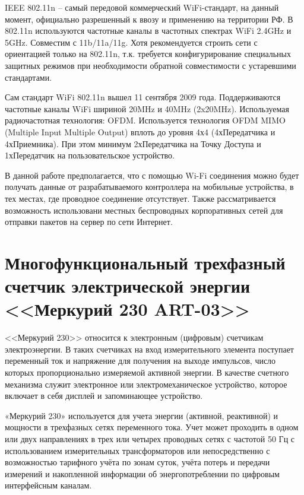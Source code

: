 \documentclass[utf8,14pt, coursreport]{G7-32}
\begin{document}
IEEE 802.11n – самый передовой коммерческий WiFi-стандарт, на данный момент, официально разрешенный к ввозу и применению на территории РФ. В 802.11n используются частотные каналы в частотных спектрах WiFi 2.4GHz и 5GHz. Совместим с 11b/11a/11g. Хотя рекомендуется строить сети с ориентацией только на 802.11n, т.к. требуется конфигурирование специальных защитных режимов при необходимости обратной совместимости с устаревшими стандартами\cite{wifistandarts}.

Сам стандарт WiFi 802.11n вышел 11 сентября 2009 года.
Поддерживаются частотные каналы WiFi шириной 20MHz и 40MHz (2x20MHz).
Используемая радиочастотная технология: OFDM.
Используется технология OFDM MIMO (Multiple Input Multiple Output) вплоть до уровня 4х4 (4хПередатчика и 4хПриемника). При этом минимум 2хПередатчика на Точку Доступа и 1хПередатчик на пользовательское устройство.

В данной работе предполагается, что с помощью Wi-Fi соединения можно будет получать данные от разрабатываемого контроллера на мобильные устройства, в тех местах, где проводное соединение отсутствует. Также рассматривается возможность использовани местных беспроводных корпоративных сетей для отправки пакетов на сервер по сети Интернет.

\newpage

\section{Многофункциональный трехфазный счетчик электрической энергии <<Меркурий 230 ART-03>>}

<<Меркурий 230>> относится к электронным (цифровым) счетчикам электроэнергии. В таких счетчиках на вход измерительного элемента поступает переменный ток и напряжение для получения на выходе импульсов, число которых пропорционально измеряемой активной энергии. В качестве счетного механизма служит электронное или электромеханическое устройство, которое включает в себя дисплей и запоминающее устройство\cite{mercinfo1}. 

«Меркурий 230» используется для учета энергии (активной, реактивной) и мощности в трехфазных сетях переменного тока. Учет может проходить в одном или двух направлениях в трех или четырех проводных сетях с частотой 50 Гц с использованием измерительных трансформаторов или непосредственно с возможностью тарифного учёта по зонам суток, учёта потерь и передачи измерений и накопленной информации об энергопотреблении по цифровым интерфейсным каналам\cite{mercinfo2}.
\end{document}

